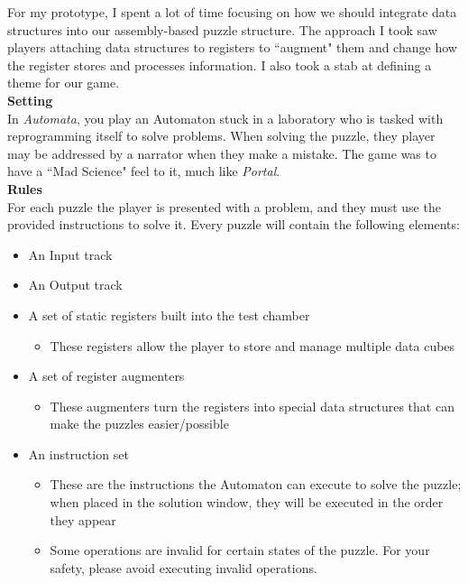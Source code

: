 For my prototype, I spent a lot of time focusing on how we should integrate data structures into our assembly-based
puzzle structure. The approach I took saw players attaching data structures to registers to ``augment" them and
change how the register stores and processes information. I also took a stab at defining a theme for our game.\\

\textbf{Setting}\\
In \textit{Automata}, you play an Automaton stuck in a laboratory who is tasked with reprogramming itself to solve problems.
When solving the puzzle, they player may be addressed by a narrator when they make a mistake. The game was to have 
a ``Mad Science" feel to it, much like \textit{Portal}.\\

\textbf{Rules}\\
For each puzzle the player is presented with a problem, and they must use the provided instructions to solve it. 
Every puzzle will contain the following elements:
\begin{itemize}
	\item An Input track
	\item An Output track
	\item A set of static registers built into the test chamber
	\begin{itemize}
		\item These registers allow the player to store and manage multiple data cubes
	\end{itemize}
	\item A set of register augmenters
	\begin{itemize}
		\item These augmenters turn the registers into special data structures that can make the puzzles easier/possible
	\end{itemize}
	\item An instruction set
	\begin{itemize}
		\item These are the instructions the Automaton can execute to solve the puzzle; when placed in the solution window,
		they will be executed in the order they appear
		\item Some operations are invalid for certain states of the puzzle. For your safety, please avoid executing invalid operations.
	\end{itemize}
\end{itemize}
\newpage

